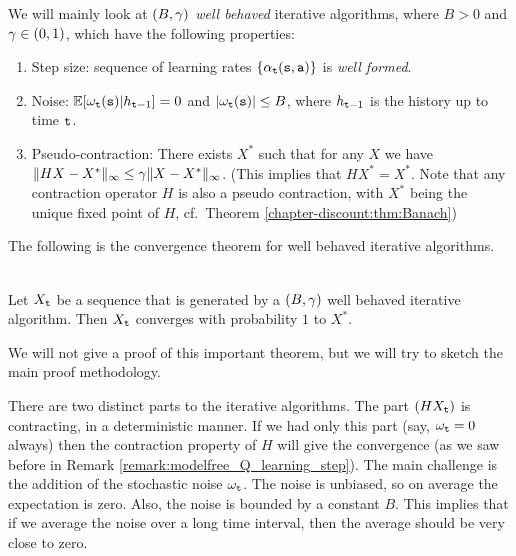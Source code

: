 We will mainly look at {\em $(B,\gamma)$ well behaved} iterative
algorithms, where $B>0$ and $\gamma\in(0,1)$, which have the
following properties:
\begin{enumerate}
\item Step size: sequence of learning rates $\{\alpha_{\tt t}({\tt s},{\tt a})\}$ is \emph{well formed}.
\item Noise: $\mathbb{E}[\omega_{\tt t}({\tt s})|h_{{\tt t}-1}]=0$ and $|\omega_{\tt t}({\tt s})|\leq B$, where
$h_{{\tt t}-1}$ is the history up to time ${\tt t}$.
\item Pseudo-contraction: There exists $X^*$ such that for any $X$ we have $\|HX-X^*\|_\infty
\leq \gamma \|X-X^*\|_\infty$. (This implies that $HX^*=X^*$.
Note that any contraction operator $H$ is also a pseudo contraction, with $X^*$ being the unique fixed point of $H$, cf.~Theorem \ref{chapter-discount:thm:Banach})
\end{enumerate}

The following is the convergence theorem for well behaved iterative
algorithms.

\begin{theorem}\ \\
\label{thm:stoch-approx}
 Let $X_{\tt t}$ be a sequence that is generated by a
$(B,\gamma)$ well behaved iterative algorithm. Then $X_{\tt t}$
converges with probability $1$ to $X^*$.
\end{theorem}

We will not give a proof of this important theorem, but we will try
to sketch the main proof methodology.

There are two distinct parts to the iterative algorithms. The part
$(HX_{\tt t})$ is contracting, in a deterministic manner. If we had
only this part (say, $\omega_{\tt t}=0$ always) then the contraction
property of $H$ will give the convergence (as we saw before in Remark \ref{remark:modelfree_Q_learning_step}). The
main challenge is the addition of the stochastic noise $\omega_{\tt t}$. The
noise is unbiased, so on average the expectation is zero. Also, the
noise is bounded by a constant $B$. This implies that if we average
the noise over a long time interval, then the average should be very
close to zero.

